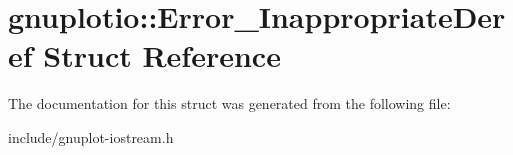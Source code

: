 \hypertarget{structgnuplotio_1_1Error__InappropriateDeref}{}\section{gnuplotio\+:\+:Error\+\_\+\+Inappropriate\+Deref Struct Reference}
\label{structgnuplotio_1_1Error__InappropriateDeref}


The documentation for this struct was generated from the following file\+:\begin{DoxyCompactItemize}
\item 
include/gnuplot-\/iostream.\+h\end{DoxyCompactItemize}
